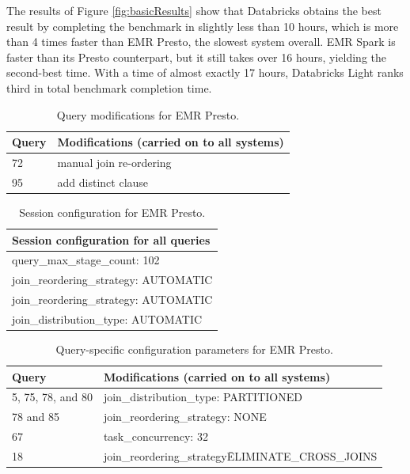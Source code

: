 The results of Figure \ref{fig:basicResults} show that Databricks obtains the best result by completing the benchmark in slightly less than 10 hours, which is more than 4 times faster than EMR Presto, the slowest system overall. EMR Spark is faster than its Presto counterpart, but it still takes over 16 hours, yielding the second-best time. With a time of almost exactly 17 hours, Databricks Light ranks third in total benchmark completion time.

\begin{table}
  \centering
	\begin{tabular}{|l|l|}
	  \hline
		\textbf{Query} & \textbf{Modifications (carried on to all systems)} \\ \hline
		72 & manual join re-ordering  \\ \hline
		95 & add distinct clause \\ \hline
	\end{tabular}
	\caption{Query modifications for EMR Presto.}
	\label{table:prestoModifiedQueries}
\end{table}

\begin{table}
  \centering
	\begin{tabular}{|l|}
	  \hline
		\textbf{Session configuration for all queries} \\ \hline
		query\_max\_stage\_count: 102  \\ \hline
		join\_reordering\_strategy: AUTOMATIC \\ \hline
		join\_reordering\_strategy: AUTOMATIC \\ \hline
		join\_distribution\_type: AUTOMATIC \\ \hline
	\end{tabular}
	\caption{Session configuration for EMR Presto.}
	\label{table:prestoSessionConf}
\end{table}

\begin{table}
  \centering
	\begin{tabular}{|l|l|}
	  \hline
		\textbf{Query} & \textbf{Modifications (carried on to all systems)} \\ \hline
		5, 75, 78, and 80 & join\_distribution\_type: PARTITIONED \\ \hline
		78 and 85 & join\_reordering\_strategy: NONE \\ \hline
		67 & task\_concurrency: 32 \\ \hline
		18 & join\_reordering\_strategy\=ELIMINATE\_CROSS\_JOINS \\ \hline
	\end{tabular}
	\caption{Query-specific configuration parameters for EMR Presto.}
	\label{table:prestoQuerySpecificConf}
\end{table}

